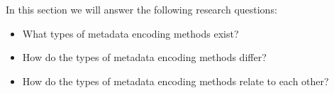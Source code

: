 {%



In this section we will answer the following research questions:

\begin{itemize}
 \item What types of metadata encoding methods exist?
 \item How do the types of metadata encoding methods differ?
 \item How do the types of metadata encoding methods relate to each other?
\end{itemize}





%




}
